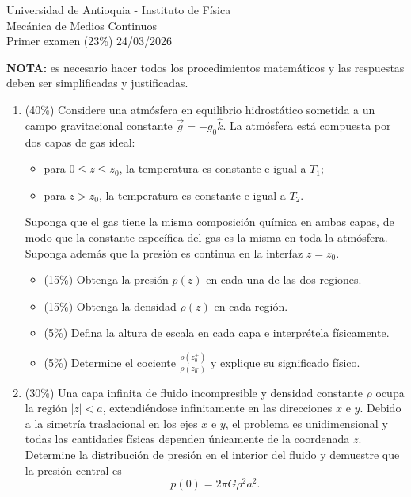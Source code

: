 \documentclass[12pt]{article}
\begin{document}
\begin{center}
    Universidad de Antioquia - Instituto de Física\\
    Mecánica de Medios Continuos\\
    Primer examen (23\%) 24/03/2026
\end{center}

\textbf{NOTA:} es necesario hacer todos los procedimientos matemáticos y las respuestas deben ser simplificadas y justificadas.

\begin{enumerate}
    \item (40\%) Considere una atmósfera en equilibrio hidrostático sometida a un campo gravitacional constante $\vec{g} = -g_0 \hat{k}$. La atmósfera está compuesta por dos capas de gas ideal:
    \begin{itemize}
        \item para $0 \le z \le z_0$, la temperatura es constante e igual a $T_1$;
        \item para $z > z_0$, la temperatura es constante e igual a $T_2$.
    \end{itemize}
    Suponga que el gas tiene la misma composición química en ambas capas, de modo que la constante específica del gas es la misma en toda la atmósfera. Suponga además que la presión es continua en la interfaz $z = z_0$.
    \begin{itemize}
        \item[a)] (15\%) Obtenga la presión $p(z)$ en cada una de las dos regiones.
        \item[b)] (15\%) Obtenga la densidad $\rho(z)$ en cada región.
        \item[c)] (5\%) Defina la altura de escala en cada capa e interprétela físicamente.
        \item[d)] (5\%) Determine el cociente $\frac{\rho(z_0^+)}{\rho(z_0^-)}$ y explique su significado físico.
    \end{itemize}

    \item (30\%) Una capa infinita de fluido incompresible y densidad constante $\rho$ ocupa la región $|z| < a$, extendiéndose infinitamente en las direcciones $x$ e $y$. Debido a la simetría traslacional en los ejes $x$ e $y$, el problema es unidimensional y todas las cantidades físicas dependen únicamente de la coordenada $z$. Determine la distribución de presión en el interior del fluido y demuestre que la presión central es
    \[
    p(0) = 2\pi G \rho^2 a^2.
    \]


\end{enumerate}
\end{document}
